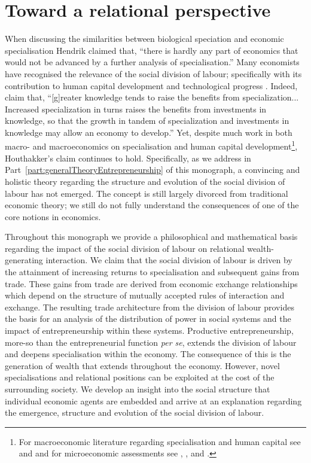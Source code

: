 \chapter{Toward a relational perspective} 
\label{ch:relationalperspective}

When discussing the similarities between biological speciation and economic specialisation Hendrik \citet[p.~182]{Houthakker1956} claimed that, ``there is hardly any part of economics that would not be advanced by a further analysis of specialisation.'' Many economists have recognised the relevance of the social division of labour; specifically with its contribution to human capital development and technological progress \citep{Liang2014}. Indeed, \citet[p.~1157]{BeckerMurphy1992} claim that, ``[g]reater knowledge tends to raise the benefits from specialization... Increased specialization in turns raises the benefits from investments in knowledge, so that the growth in tandem of specialization and investments in knowledge may allow an economy to develop.'' Yet, despite much work in both macro- and macroeconomics on specialisation and human capital development\footnote{For macroeconomic literature regarding specialisation and human capital see \citet{Rosen1983} and \citet{Lucas1988} and for microeconomic assessments see \citet{YangBorland1991}, \citet{YangShi1992}, and \citet{ChengYang2004}.}, Houthakker's claim continues to hold. Specifically, as we address in Part~\ref{part:generalTheoryEntrepreneurship} of this monograph, a convincing and holistic theory regarding the structure and evolution of the social division of labour has not emerged. The concept is still largely divorced from traditional economic theory; we still do not fully understand the consequences of one of the core notions in economics.

Throughout this monograph we provide a philosophical and mathematical basis regarding the impact of the social division of labour on relational wealth-generating interaction. We claim that the social division of labour is driven by the attainment of increasing returns to specialisation and subsequent gains from trade. These gains from trade are derived from economic exchange relationships which depend on the structure of mutually accepted rules of interaction and exchange. The resulting trade architecture from the division of labour provides the basis for an analysis of the distribution of power in social systems and the impact of entrepreneurship within these systems. Productive entrepreneurship, more-so than the entrepreneurial function \emph{per se}, extends the division of labour and deepens specialisation within the economy. The consequence of this is the generation of wealth that extends throughout the economy. However, novel specialisations and relational positions can be exploited at the cost of the surrounding society. We develop an insight into the social structure that individual economic agents are embedded and arrive at an explanation regarding the emergence, structure and evolution of the social division of labour. 

